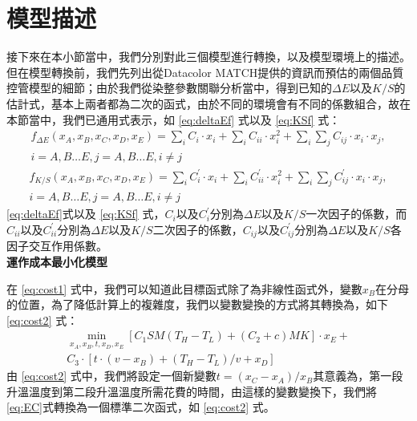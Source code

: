 \section{模型描述}
\label{c:ch5.1}
接下來在本小節當中，我們分別對此三個模型進行轉換，以及模型環境上的描述。但在模型轉換前，我們先列出從Datacolor MATCH提供的資訊而預估的兩個品質控管模型的細節；由於我們從染整參數關聯分析當中，得到已知的$\Delta E$以及$K/S$的估計式，基本上兩者都為二次的函式，由於不同的環境會有不同的係數組合，故在本節當中，我們已通用式表示，如 \ref{eq:deltaEf} 式以及 \ref{eq:KSf} 式：
\begin{equation}
	\begin{array}{c}
	f_{\Delta E}(x_A,x_B,x_C,x_D,x_E)=\sum_i C_i\cdot x_i + \sum_i C_{ii}\cdot x_i^2+\sum_i\sum_j C_{ij}\cdot x_{i}\cdot x_{j},\\i=A,B\dots E,j=A,B\dots E , i\neq j
	\end{array}
\label{eq:deltaEf}
\end{equation}
\begin{equation}
	\begin{array}{c}
	f_{K/S}(x_A,x_B,x_C,x_D,x_E)=\sum_i C_i^{'}\cdot x_i+ \sum_i C_{ii}^{'}\cdot x_i^2+\sum_i\sum_j C_{ij}^{'}\cdot x_{i}\cdot x_{j},\\i=A,B\dots E,j=A,B\dots E,i\neq j
	\end{array}
\label{eq:KSf}
\end{equation}
\ref{eq:deltaEf}式以及 \ref{eq:KSf} 式，$C_{i}$以及$C_i^{'}$分別為$\Delta E$以及$K/S$一次因子的係數，而$C_{ii}$以及$C_{ii}^{'}$分別為$\Delta E$以及$K/S$二次因子的係數，$C_{ij}$以及$C_{ij}^{'}$分別為$\Delta E$以及$K/S$各因子交互作用係數。
\\ \textbf{運作成本最小化模型}

在 \ref{eq:cost1} 式中，我們可以知道此目標函式除了為非線性函式外，變數$x_B$在分母的位置，為了降低計算上的複雜度，我們以變數變換的方式將其轉換為，如下 \ref{eq:cost2} 式：
\begin{equation}
	\begin{split}
	\min_{x_A,x_B,t,x_D,x_E} [C_1SM(T_H-T_L)+(C_2+c)MK]\cdot x_E+\\
	C_3 \cdot [t\cdot (v-x_B)+(T_H-T_L)/v+x_D]
	\end{split}
\label{eq:cost2}
\end{equation}
由 \ref{eq:cost2} 式中，我們將設定一個新變數$t=(x_C-x_A)/x_B$其意義為，第一段升溫溫度到第二段升溫溫度所需花費的時間，由這樣的變數變換下，我們將\ref{eq:EC}式轉換為一個標準二次函式，如 \ref{eq:cost2} 式。

